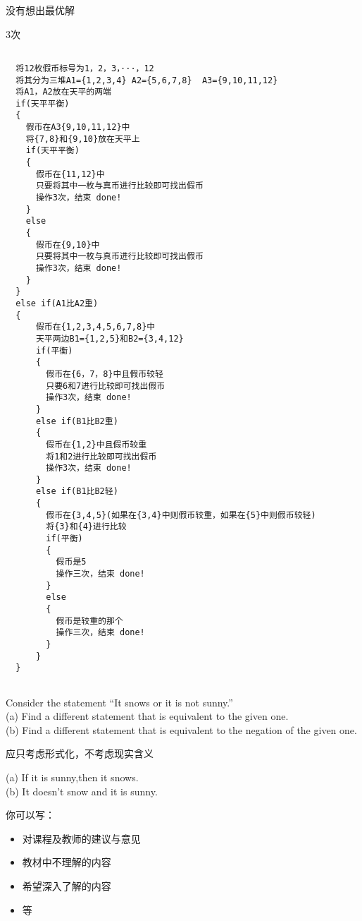 \documentclass[11pt, a4paper, UTF8]{ctexart}
\begin{document}
\begin{cause}
  没有想出最优解
\end{cause}

\begin{revision}

3次\\
\begin{lstlisting}

  将12枚假币标号为1，2，3，···，12
  将其分为三堆A1={1,2,3,4} A2={5,6,7,8}  A3={9,10,11,12}
  将A1，A2放在天平的两端
  if(天平平衡)
  {
    假币在A3{9,10,11,12}中
    将{7,8}和{9,10}放在天平上
    if(天平平衡)
    {
      假币在{11,12}中
      只要将其中一枚与真币进行比较即可找出假币
      操作3次，结束 done!
    }
    else
    {
      假币在{9,10}中
      只要将其中一枚与真币进行比较即可找出假币
      操作3次，结束 done!
    }
  }
  else if(A1比A2重)
  {
      假币在{1,2,3,4,5,6,7,8}中
      天平两边B1={1,2,5}和B2={3,4,12}
      if(平衡)
      {
        假币在{6，7，8}中且假币较轻
        只要6和7进行比较即可找出假币
        操作3次，结束 done!
      }
      else if(B1比B2重)
      {
        假币在{1,2}中且假币较重
        将1和2进行比较即可找出假币
        操作3次，结束 done!
      }
      else if(B1比B2轻)
      {
        假币在{3,4,5}(如果在{3,4}中则假币较重，如果在{5}中则假币较轻)
        将{3}和{4}进行比较
        if(平衡)
        {
          假币是5
          操作三次，结束 done!
        }
        else
        {
          假币是较重的那个
          操作三次，结束 done!
        }
      }
  }
  
\end{lstlisting}

\end{revision}


\begin{problem}[UD:2.10]
Consider the statement “It snows or it is not sunny.” \\
(a) Find a different statement that is equivalent to the given one.\\
(b) Find a different statement that is equivalent to the negation of the given one.
\end{problem}

\begin{cause}
应只考虑形式化，不考虑现实含义
\end{cause}

\begin{revision}
(a) If it is sunny,then it snows.\\
(b) It doesn't snow and it is sunny.\\
\end{revision}



\beginfb	%

你可以写：
\begin{itemize}
  \item 对课程及教师的建议与意见
  \item 教材中不理解的内容
  \item 希望深入了解的内容
  \item 等
\end{itemize}
\end{document}
